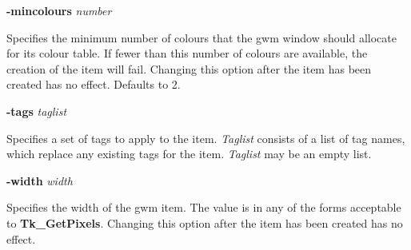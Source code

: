 {\bf -mincolours} {\em number}
\begin{rquote}
Specifies the minimum number of colours that the gwm window should allocate
for its colour table. If fewer than this number of colours are available,
the creation of the item will fail. Changing this option after the item
has been created has no effect. Defaults to 2.
\end{rquote}

%

{\bf -tags} {\em taglist}
\begin{rquote}
Specifies a set of tags to apply to the item. {\em Taglist} consists
of a list of tag names, which replace any existing tags for the item.
{\em Taglist} may be an empty list.
\end{rquote}

{\bf -width} {\em width}
\begin{rquote}
Specifies the width of the gwm item. The value is in any of the forms
acceptable to {\bf Tk\_GetPixels}. Changing this option after the item
has been created has no effect.
\end{rquote}

%
%


